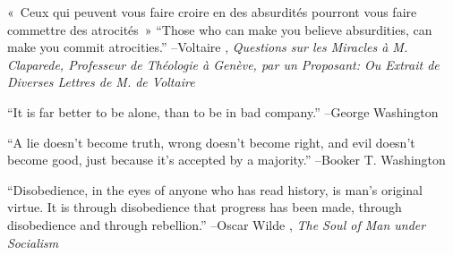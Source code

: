 \documentclass{article}%
\begin{document}
\linebreak%
\vspace{1mm}%
\begin{minipage}{\textwidth}%
\flushleft%
«~Ceux qui peuvent vous faire croire en des absurdités pourront vous faire commettre des atrocités~»%
\linebreak%
\vspace{1mm}%
“Those who can make you believe absurdities, can make you commit atrocities.”%
\linebreak%
–Voltaire%
, \textit{Questions sur les Miracles à M. Claparede, Professeur de Théologie à Genève, par un Proposant: Ou Extrait de Diverses Lettres de M. de Voltaire}%
\linebreak%
\vspace{1mm}%
\end{minipage}%
\linebreak%
\vspace{1mm}%
\begin{minipage}{\textwidth}%
\flushleft%
“It is far better to be alone, than to be in bad company.”%
\linebreak%
\vspace{1mm}%
–George Washington%
\linebreak%
\vspace{1mm}%
\end{minipage}%
\linebreak%
\vspace{1mm}%
\begin{minipage}{\textwidth}%
\flushleft%
“A lie doesn't become truth, wrong doesn't become right, and evil doesn't become good, just because it's accepted by a majority.”%
\linebreak%
\vspace{1mm}%
–Booker T. Washington%
\linebreak%
\vspace{1mm}%
\end{minipage}%
\linebreak%
\vspace{1mm}%
\begin{minipage}{\textwidth}%
\flushleft%
“Disobedience, in the eyes of anyone who has read history, is man's original virtue. It is through disobedience that progress has been made, through disobedience and through rebellion.”%
\linebreak%
\vspace{1mm}%
–Oscar Wilde%
, \textit{The Soul of Man under Socialism}%
\linebreak%
\vspace{1mm}%
\end{minipage}%
\end{document}
